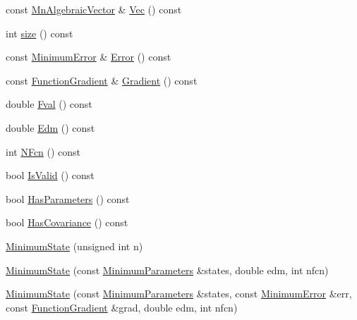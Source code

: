\begin{DoxyCompactItemize}
\item 
const \mbox{\hyperlink{namespaceROOT_1_1Minuit2_a62ed97730a1ca8d3fbaec64a19aa11c9}{Mn\+Algebraic\+Vector}} \& \mbox{\hyperlink{classROOT_1_1Minuit2_1_1MinimumState_a0c7ad9c9226473f87b1bbb15ed87bbcd}{Vec}} () const
\item 
int \mbox{\hyperlink{classROOT_1_1Minuit2_1_1MinimumState_af680928a4485a4d0db0c81a8283d24bd}{size}} () const
\item 
const \mbox{\hyperlink{classROOT_1_1Minuit2_1_1MinimumError}{Minimum\+Error}} \& \mbox{\hyperlink{classROOT_1_1Minuit2_1_1MinimumState_a28d9bb6148e54a7bf4ca15ca9548fe23}{Error}} () const
\item 
const \mbox{\hyperlink{classROOT_1_1Minuit2_1_1FunctionGradient}{Function\+Gradient}} \& \mbox{\hyperlink{classROOT_1_1Minuit2_1_1MinimumState_a08a0d667e1f89522a29c49c9c02e642d}{Gradient}} () const
\item 
double \mbox{\hyperlink{classROOT_1_1Minuit2_1_1MinimumState_aad936fc04cd24c5b769748b93ded0ab9}{Fval}} () const
\item 
double \mbox{\hyperlink{classROOT_1_1Minuit2_1_1MinimumState_a397315b170efca9446f7d6a91bae6c59}{Edm}} () const
\item 
int \mbox{\hyperlink{classROOT_1_1Minuit2_1_1MinimumState_aedc2a07bcaf49ef63ac092a867463731}{N\+Fcn}} () const
\item 
bool \mbox{\hyperlink{classROOT_1_1Minuit2_1_1MinimumState_ae8bab1ba76b2d6597c79224e966da5f5}{Is\+Valid}} () const
\item 
bool \mbox{\hyperlink{classROOT_1_1Minuit2_1_1MinimumState_a5871d5838abf68982d9e2ed7a66ea5c3}{Has\+Parameters}} () const
\item 
bool \mbox{\hyperlink{classROOT_1_1Minuit2_1_1MinimumState_aba1e55d52217a591657dba0cc9fa8c9c}{Has\+Covariance}} () const
\item 
\mbox{\hyperlink{classROOT_1_1Minuit2_1_1MinimumState_a47a98082c74eff4dc1fc1758078c27d6}{Minimum\+State}} (unsigned int n)
\item 
\mbox{\hyperlink{classROOT_1_1Minuit2_1_1MinimumState_a602211ccc0379969a079ebf4de44421b}{Minimum\+State}} (const \mbox{\hyperlink{classROOT_1_1Minuit2_1_1MinimumParameters}{Minimum\+Parameters}} \&states, double edm, int nfcn)
\item 
\mbox{\hyperlink{classROOT_1_1Minuit2_1_1MinimumState_a35c2e0098d60a9caeee9e2c60093b5a9}{Minimum\+State}} (const \mbox{\hyperlink{classROOT_1_1Minuit2_1_1MinimumParameters}{Minimum\+Parameters}} \&states, const \mbox{\hyperlink{classROOT_1_1Minuit2_1_1MinimumError}{Minimum\+Error}} \&err, const \mbox{\hyperlink{classROOT_1_1Minuit2_1_1FunctionGradient}{Function\+Gradient}} \&grad, double edm, int nfcn)

\end{DoxyCompactItemize}
